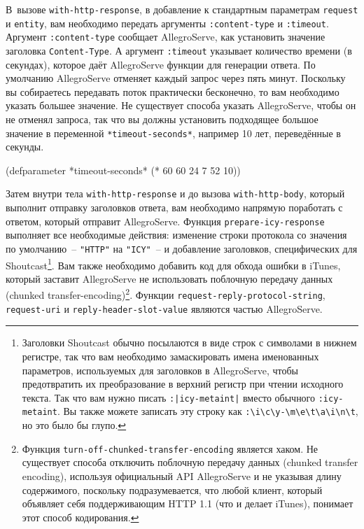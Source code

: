 В~вызове \lstinline{with-http-response}, в добавление к стандартным параметрам \lstinline{request} и
\lstinline{entity}, вам необходимо передать аргументы \lstinline{:content-type} и \lstinline{:timeout}.
Аргумент \lstinline{:content-type} сообщает AllegroServe, как установить значение заголовка
\lstinline{Content-Type}.  А аргумент \lstinline{:timeout} указывает количество времени (в
секундах), которое даёт AllegroServe функции для генерации ответа. По умолчанию
AllegroServe отменяет каждый запрос через пять минут.  Поскольку вы собираетесь передавать
поток практически бесконечно, то вам необходимо указать большее значение.  Не существует
способа указать AllegroServe, чтобы он не отменял запроса, так что вы должны установить
подходящее большое значение в переменной \lstinline{*timeout-seconds*}, например 10 лет,
переведённые в секунды.

\begin{myverb}
(defparameter *timeout-seconds* (* 60 60 24 7 52 10))
\end{myverb}

Затем внутри тела \lstinline{with-http-response} и до вызова \lstinline{with-http-body}, который
выполнит отправку заголовков ответа, вам необходимо напрямую поработать с ответом, который
отправит AllegroServe.  Функция \lstinline{prepare-icy-response} выполняет все необходимые
действия: изменение строки протокола со значения по умолчанию~-- \lstinline{"HTTP"} на
\lstinline{"ICY"}~-- и добавление заголовков, специфических для Shoutcast\footnote{Заголовки
  Shoutcast обычно посылаются в виде строк с символами в нижнем регистре, так что вам
  необходимо замаскировать имена именованных параметров, используемых для заголовков в
  AllegroServe, чтобы предотвратить их преобразование в верхний регистр при чтении
  исходного текста.  Так что вам нужно писать \lstinline{:|icy-metaint|} вместо обычного
  \lstinline{:icy-metaint}.  Вы также можете записать эту строку как
  \lstinline!:\i\c\y-\m\e\t\a\i\n\t!, но это было бы глупо.}.  Вам также необходимо
добавить код для обхода ошибки в iTunes, который заставит AllegroServe не использовать
поблочную передачу данных (chunked transfer-encoding)\footnote{Функция
  \lstinline{turn-off-chunked-transfer-encoding} является хаком.  Не существует способа
  отключить поблочную передачу данных (chunked transfer encoding), используя официальный API AllegroServe и не
  указывая длину содержимого, поскольку подразумевается, что любой клиент, который
  объявляет себя поддерживающим HTTP 1.1 (что и делает iTunes), понимает этот способ
  кодирования.}.  Функции \lstinline{request-reply-protocol-string}, \lstinline{request-uri} и
\lstinline{reply-header-slot-value} являются частью AllegroServe.

